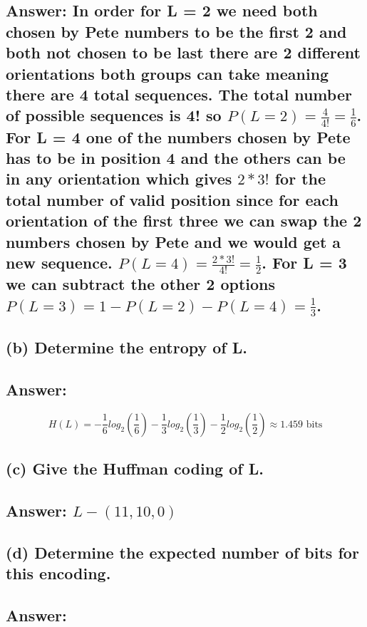 \documentclass[11px]{article}
\begin{document}
\subsection*{Answer: In order for L = 2 we need both chosen by Pete numbers to be the first 2 and both not chosen to be last there are 2 different orientations both groups can take meaning there are 4 total sequences. The total number of possible sequences is 4! so $P(L = 2) = \frac{4}{4!} = \frac{1}{6}$. For L = 4 one of the numbers chosen by Pete has to be in position 4 and the others can be in any orientation which gives $2*3!$ for the total number of valid position since for each orientation of the first three we can swap the 2 numbers chosen by Pete and we would get a new sequence. $P(L = 4) = \frac{2*3!}{4!} = \frac{1}{2}$. For L = 3 we can subtract the other 2 options $P(L = 3) = 1 - P(L = 2) - P(L = 4) = \frac{1}{3}$.}

\subsection*{\normalfont (b) Determine the entropy of L.}

\subsection*{Answer:}

\begin{equation}
H(L) = -\frac{1}{6}log_2(\frac{1}{6}) -\frac{1}{3}log_2(\frac{1}{3}) -\frac{1}{2}log_2(\frac{1}{2}) \approx 1.459 \text{ bits}
\end{equation}

\subsection*{\normalfont (c) Give the Huffman coding of L.}

\subsection*{Answer: $L - (11,10,0)$}

\subsection*{\normalfont (d) Determine the expected number of bits for this encoding.}

\subsection*{Answer: }
\end{document}
